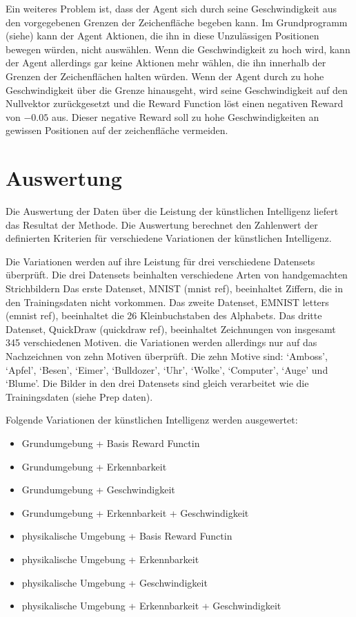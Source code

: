 
Ein weiteres Problem ist, dass der Agent sich durch seine Geschwindigkeit aus
den vorgegebenen Grenzen der Zeichenfläche begeben kann. Im Grundprogramm  
(siehe) kann der Agent Aktionen, die ihn in diese Unzulässigen Positionen  %
bewegen würden, nicht auswählen. Wenn die Geschwindigkeit zu hoch wird, kann der
Agent allerdings gar keine Aktionen mehr wählen, die ihn innerhalb der Grenzen der
Zeichenflächen halten würden. Wenn der Agent durch zu hohe Geschwindigkeit über
die Grenze hinausgeht, wird seine Geschwindigkeit auf den Nullvektor
zurückgesetzt und die Reward Function löst einen negativen Reward von $-0.05$
aus. Dieser negative Reward soll zu hohe Geschwindigkeiten an gewissen
Positionen auf der zeichenfläche vermeiden.


\section{Auswertung}
\label{chap:m_auswert}
Die Auswertung der Daten über die Leistung der künstlichen Intelligenz liefert
das Resultat der Methode. Die Auswertung berechnet den Zahlenwert der
definierten Kriterien für verschiedene Variationen der künstlichen Intelligenz.

Die Variationen werden auf ihre Leistung für drei verschiedene Datensets
überprüft. Die drei Datensets beinhalten verschiedene Arten von handgemachten
Strichbildern Das erste Datenset, MNIST (mnist ref),  beeinhaltet Ziffern, die
in den Trainingsdaten nicht vorkommen. Das zweite Datenset, EMNIST letters
(emnist ref), beeinhaltet die 26 Kleinbuchstaben des Alphabets. Das dritte
Datenset, QuickDraw (quickdraw ref), beeinhaltet Zeichnungen von insgesamt 345
verschiedenen Motiven. die Variationen werden allerdings nur auf das
Nachzeichnen von zehn Motiven überprüft. Die zehn Motive sind: `Amboss',
`Apfel', `Besen', `Eimer', `Bulldozer', `Uhr', `Wolke', `Computer', `Auge' und
`Blume'. Die Bilder in den drei Datensets sind gleich verarbeitet wie die
Trainingsdaten (siehe Prep daten). 

Folgende Variationen der künstlichen Intelligenz werden ausgewertet:

\begin{itemize}
  \item Grundumgebung + Basis Reward Functin
  \item Grundumgebung + Erkennbarkeit
  \item Grundumgebung + Geschwindigkeit
  \item Grundumgebung + Erkennbarkeit + Geschwindigkeit
  \item physikalische Umgebung + Basis Reward Functin
  \item physikalische Umgebung + Erkennbarkeit
  \item physikalische Umgebung + Geschwindigkeit
  \item physikalische Umgebung + Erkennbarkeit + Geschwindigkeit
\end{itemize}

